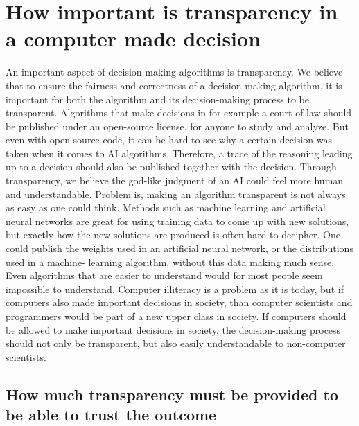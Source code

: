 \documentclass[11pt]{article}
\begin{document}
\section{How important is transparency in a computer made decision}
An important aspect of decision-making algorithms is transparency. We believe that to ensure the
fairness and correctness of a decision-making algorithm, it is important for
both the algorithm and its decision-making process to be transparent. Algorithms
that make decisions in for example a court of law should be published under an
open-source license, for anyone to study and analyze. But even with open-source
code, it can be hard to see why a certain decision was taken when it comes to AI
algorithms. Therefore, a trace of the reasoning leading up to a decision should
also be published together with the decision. Through transparency, we believe
the god-like judgment of an AI could feel more human and understandable.
Problem is, making an algorithm transparent is not always as easy as one could
think. Methods such as machine learning and artificial neural networks are great
for using training data to come up with new solutions, but exactly how the new
solutions are produced is often hard to decipher. One could publish the weights
used in an artificial neural network, or the distributions used in a machine-
learning algorithm, without this data making much sense.  Even algorithms that are easier to understand
would for most people seem impossible to understand. Computer illiteracy is a
problem as it is today, but if computers also made important decisions in
society, than computer scientists and programmers would be part of a new upper
class in society.  If computers should be
allowed to make important decisions in society, the decision-making process
should not only be transparent, but also easily understandable to non-computer
scientists.



\subsection{How much transparency must be provided to be able to trust the outcome}
\end{document}
